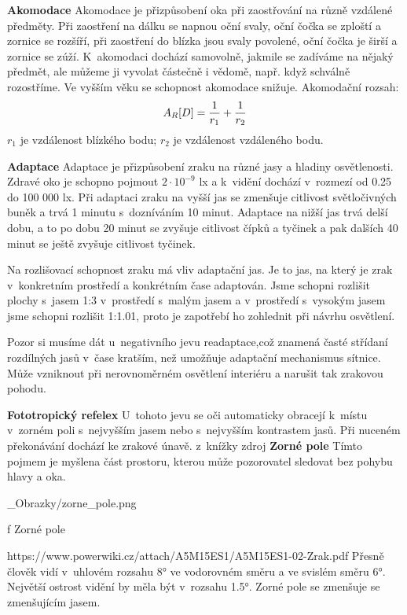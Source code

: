 {\bf Akomodace}
\medskip
Akomodace je přizpůsobení oka při zaostřování na různě vzdálené předměty.
Při zaostření na dálku se napnou oční svaly, oční čočka se zploští a zornice se rozšíří, při zaostření
do blízka jsou svaly povolené, oční čočka je širší a zornice se zúží.
K~akomodaci dochází samovolně, jakmile se zadíváme na nějaký předmět, ale můžeme ji vyvolat částečně i vědomě,
např. když schválně rozostříme. Ve vyšším věku se schopnost akomodace snižuje.
\medskip
Akomodační rozsah:
$$A_R [D] = {1\over r_1}+{1\over r_2}$$
\medskip
$r_1$ je vzdálenost blízkého bodu;
\medskip
$r_2$ je vzdálenost vzdáleného bodu.
\medskip

{\bf Adaptace}
\medskip
Adaptace je přizpůsobení zraku na různé jasy a hladiny osvětlenosti. Zdravé oko je schopno pojmout $2\cdot10^{-9}$ lx a
k~vidění dochází v~rozmezí od 0.25 do 100 000 lx.
\medskip
Při adaptaci zraku na vyšší jas se zmenšuje citlivost světločivných buněk a trvá 1 minutu s~dozníváním 10 minut.
Adaptace na nižší jas trvá delší dobu, a to po dobu 20 minut se zvyšuje citlivost čípků a tyčinek a pak dalších 40 minut
se ještě zvyšuje citlivost tyčinek.

Na rozlišovací schopnost zraku má vliv adaptační jas. Je to jas, na který je zrak v~konkretním prostředí a konkrétním
čase adaptován. Jsme schopni rozlišit plochy s~jasem 1:3 v~prostředí s~malým jasem a v~prostředí s~vysokým
jasem jsme schopni rozlišit 1:1.01, proto je zapotřebí ho zohlednit při návrhu osvětlení.

Pozor si musíme dát u~negativního jevu readaptace,což znamená časté střídaní rozdílných jasů v~čase kratším, než
umožňuje adaptační mechanismus sítnice. Může vzniknout při nerovnoměrném osvětlení interiéru a narušit tak zrakovou pohodu.

\medskip

{\bf Fototropický refelex}
\medskip
U~tohoto jevu se oči automaticky obracejí k~místu v~zorném poli s~nejvyšším jasem nebo s~nejvyšším kontrastem jasů.
Při nuceném překonávání dochází ke zrakové únavě.
z~knížky zdroj
\medskip
{\bf Zorné pole}
\medskip
Tímto pojmem je myšlena část prostoru, kterou může pozorovatel sledovat bez pohybu hlavy a oka.

\medskip {}
\picw=12cm _Obrazky/zorne_pole.png
\caption/f Zorné pole

\medskip
https://www.powerwiki.cz/attach/A5M15ES1/A5M15ES1-02-Zrak.pdf
\medskip
Přesně člověk vidí v~uhlovém rozsahu 8° ve vodorovném směru a ve svislém směru 6°. Největší ostrost vidění by měla
být v~rozsahu 1.5°. Zorné pole se zmenšuje se zmenšujícím jasem.

